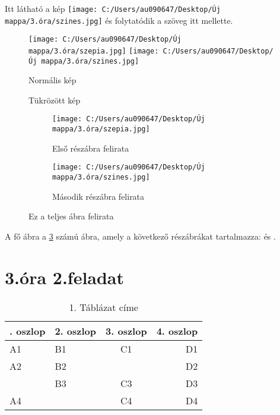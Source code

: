 \documentclass[12]{article}
\begin{document}
\lipsum[4]
\newpage

\lipsum[1]


Itt látható a kép \texttt{[image: C:/Users/au090647/Desktop/Új mappa/3.óra/szines.jpg]} és folytatódik a szöveg itt mellette. \lipsum[2]

\lipsum[3]


\begin{figure}[htbp]
    \centering
    \texttt{[image: C:/Users/au090647/Desktop/Új mappa/3.óra/szepia.jpg]}
    \texttt{[image: C:/Users/au090647/Desktop/Új mappa/3.óra/szines.jpg]}
    \caption{Normális kép}
    \caption{Tükrözött kép}
\end{figure}


\lipsum[4]
\newpage

\begin{figure}[htbp]
    \centering
    \begin{subfigure}{0.45\textwidth}
        \centering
        \texttt{[image: C:/Users/au090647/Desktop/Új mappa/3.óra/szepia.jpg]}
        \caption{Első részábra felirata}
        \label{fig:sub1} %
    \end{subfigure}
    \hspace{0.05\textwidth} %
    \begin{subfigure}{0.45\textwidth}
        \centering
        \texttt{[image: C:/Users/au090647/Desktop/Új mappa/3.óra/szines.jpg]}
        \caption{Második részábra felirata}
        \label{fig:sub2} %
    \end{subfigure}
    \caption{Ez a teljes ábra felirata}
    \label{fig:main} %
\end{figure}

A fő ábra a \ref{fig:main} számú ábra, amely a következő részábrákat tartalmazza:  és .
\newpage

\section{3.óra 2.feladat}

\begin{table}[htbp]
    \centering
    \caption{1. Táblázat címe}
    \begin{tabular}{>{\centering\arraybackslash}p{30pt} | l | c | r}
        \toprule
        1. oszlop & 2. oszlop & 3. oszlop & 4. oszlop \\
        \midrule
        A1 & B1 & C1 & D1 \\
        A2 & B2 & & D2 \\
        & B3 & C3 & D3 \\
        A4 & & C4 & D4 \\
        \bottomrule
    \end{tabular}
\end{table}
\end{document}
